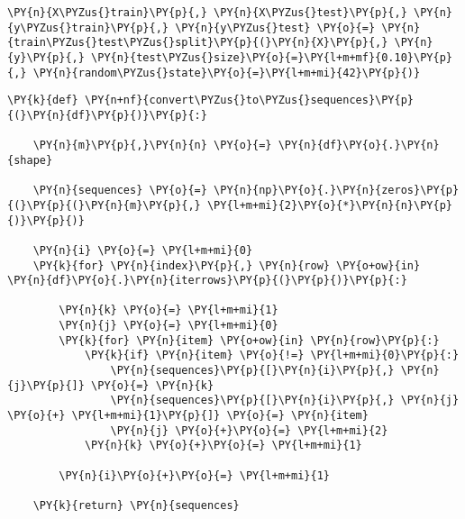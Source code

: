     \begin{tcolorbox}[breakable, size=fbox, boxrule=1pt, pad at break*=1mm,colback=cellbackground, colframe=cellborder]
\begin{Verbatim}[commandchars=\\\{\}]
\PY{n}{X\PYZus{}train}\PY{p}{,} \PY{n}{X\PYZus{}test}\PY{p}{,} \PY{n}{y\PYZus{}train}\PY{p}{,} \PY{n}{y\PYZus{}test} \PY{o}{=} \PY{n}{train\PYZus{}test\PYZus{}split}\PY{p}{(}\PY{n}{X}\PY{p}{,} \PY{n}{y}\PY{p}{,} \PY{n}{test\PYZus{}size}\PY{o}{=}\PY{l+m+mf}{0.10}\PY{p}{,} \PY{n}{random\PYZus{}state}\PY{o}{=}\PY{l+m+mi}{42}\PY{p}{)}
\end{Verbatim}
\end{tcolorbox}

    \begin{tcolorbox}[breakable, size=fbox, boxrule=1pt, pad at break*=1mm,colback=cellbackground, colframe=cellborder]
\begin{Verbatim}[commandchars=\\\{\}]
\PY{k}{def} \PY{n+nf}{convert\PYZus{}to\PYZus{}sequences}\PY{p}{(}\PY{n}{df}\PY{p}{)}\PY{p}{:}
    
    \PY{n}{m}\PY{p}{,}\PY{n}{n} \PY{o}{=} \PY{n}{df}\PY{o}{.}\PY{n}{shape}
    
    \PY{n}{sequences} \PY{o}{=} \PY{n}{np}\PY{o}{.}\PY{n}{zeros}\PY{p}{(}\PY{p}{(}\PY{n}{m}\PY{p}{,} \PY{l+m+mi}{2}\PY{o}{*}\PY{n}{n}\PY{p}{)}\PY{p}{)}
    
    \PY{n}{i} \PY{o}{=} \PY{l+m+mi}{0}
    \PY{k}{for} \PY{n}{index}\PY{p}{,} \PY{n}{row} \PY{o+ow}{in} \PY{n}{df}\PY{o}{.}\PY{n}{iterrows}\PY{p}{(}\PY{p}{)}\PY{p}{:}
        
        \PY{n}{k} \PY{o}{=} \PY{l+m+mi}{1}
        \PY{n}{j} \PY{o}{=} \PY{l+m+mi}{0}
        \PY{k}{for} \PY{n}{item} \PY{o+ow}{in} \PY{n}{row}\PY{p}{:} 
            \PY{k}{if} \PY{n}{item} \PY{o}{!=} \PY{l+m+mi}{0}\PY{p}{:}
                \PY{n}{sequences}\PY{p}{[}\PY{n}{i}\PY{p}{,} \PY{n}{j}\PY{p}{]} \PY{o}{=} \PY{n}{k}
                \PY{n}{sequences}\PY{p}{[}\PY{n}{i}\PY{p}{,} \PY{n}{j} \PY{o}{+} \PY{l+m+mi}{1}\PY{p}{]} \PY{o}{=} \PY{n}{item}
                \PY{n}{j} \PY{o}{+}\PY{o}{=} \PY{l+m+mi}{2}
            \PY{n}{k} \PY{o}{+}\PY{o}{=} \PY{l+m+mi}{1}
        
        \PY{n}{i}\PY{o}{+}\PY{o}{=} \PY{l+m+mi}{1}

    \PY{k}{return} \PY{n}{sequences} 
\end{Verbatim}
\end{tcolorbox}

